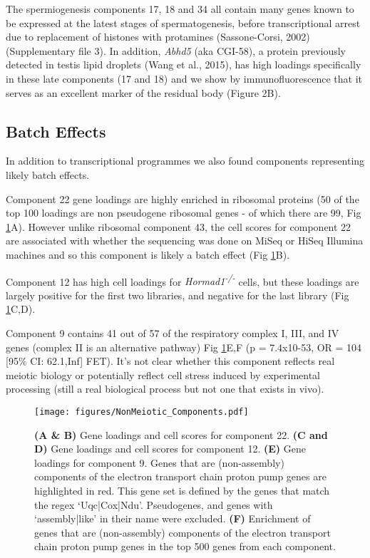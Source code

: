 The spermiogenesis components 17, 18 and 34 all contain many genes known to be expressed at the latest stages of spermatogenesis, before transcriptional arrest due to replacement of histones with protamines (Sassone-Corsi, 2002) (Supplementary file 3). In addition, \textit{Abhd5} (aka CGI-58), a protein previously detected in testis lipid droplets (Wang et al., 2015), has high loadings specifically in these late components (17 and 18) and we show by immunofluorescence that it serves as an excellent marker of the residual body (Figure 2B).

\subsection{Batch Effects}

In addition to transcriptional programmes we also found components representing likely batch effects. 

Component 22 gene loadings are highly enriched in ribosomal proteins (50 of the top 100 loadings are non pseudogene ribosomal genes - of which there are 99, Fig \ref{fig:NonMeiotic}A). However unlike ribosomal component 43, the cell scores for component 22 are associated with whether the sequencing was done on MiSeq or HiSeq Illumina machines and so this component is likely a batch effect (Fig \ref{fig:NonMeiotic}B).

Component 12 has high cell loadings for \textit{Hormad1\textsuperscript{-/-}} cells, but these loadings are largely positive for the first two libraries, and negative for the last library (Fig \ref{fig:NonMeiotic}C,D).

Component 9 contains 41 out of 57 of the respiratory complex I, III, and IV genes (complex II is an alternative pathway) Fig \ref{fig:NonMeiotic}E,F (p = 7.4x10-53, OR = 104 [95\% CI: 62.1,Inf] FET). It's not clear whether this component reflects real meiotic biology or potentially reflect cell stress induced by experimental processing (still a real biological process but not one that exists in vivo).


\begin{figure}[H]
	\centering
	\texttt{[image: figures/NonMeiotic\_Components.pdf]}
	\caption{
		\textbf{(A \& B)} Gene loadings and cell scores for component 22.
		\textbf{(C and D)} Gene loadings and cell scores for component 12.
		\textbf{(E)} Gene loadings for component 9. Genes that are (non-assembly) components of the electron transport chain proton pump genes are highlighted in red. This gene set is defined by the genes that match the regex ‘Uqc|Cox|Ndu’. Pseudogenes, and genes with ‘assembly|like’ in their name were excluded.
		\textbf{(F)} Enrichment of genes that are (non-assembly) components of the electron transport chain proton pump genes in the top 500 genes from each component.
	}
	\label{fig:NonMeiotic}
\end{figure}


